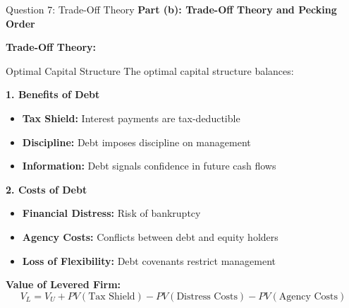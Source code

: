 \documentclass[aspectratio=169]{beamer}
\newcommand{\question}[1]{{\large\bfseries\color{crimson}#1}}
\newcommand{\subquestion}[1]{{\bfseries\color{darkgreen}#1}}
\begin{document}
	\begin{frame}{Question 7: Trade-Off Theory}
		\question{Part (b): Trade-Off Theory and Pecking Order}
		
		\textbf{Trade-Off Theory:}
		
		\begin{block}{Optimal Capital Structure}
			The optimal capital structure balances:
			
			\subquestion{1. Benefits of Debt}
			\begin{itemize}
				\item \textbf{Tax Shield:} Interest payments are tax-deductible
				\item \textbf{Discipline:} Debt imposes discipline on management
				\item \textbf{Information:} Debt signals confidence in future cash flows
			\end{itemize}
			
			\subquestion{2. Costs of Debt}
			\begin{itemize}
				\item \textbf{Financial Distress:} Risk of bankruptcy
				\item \textbf{Agency Costs:} Conflicts between debt and equity holders
				\item \textbf{Loss of Flexibility:} Debt covenants restrict management
			\end{itemize}
			
			\textbf{Value of Levered Firm:}
			\[
			V_L = V_U + PV(\text{Tax Shield}) - PV(\text{Distress Costs}) - PV(\text{Agency Costs})
			\]
		\end{block}
	\end{frame}
	
\end{document}
